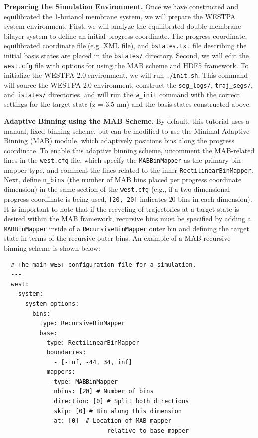 \textbf{Preparing the Simulation Environment.}  Once we have constructed and equilibrated the 1-butanol membrane system, we will prepare the WESTPA system environment. 
First, we will analyze the equilibrated double membrane bilayer system to define an initial progress coordinate. 
The progress coordinate, equilibrated coordinate file (e.g. XML file), and \verb|bstates.txt| file describing the initial basis states are placed in the \verb|bstates/| directory. 
Second, we will edit the \verb|west.cfg| file with options for using the MAB scheme and HDF5 framework. 
To initialize the WESTPA 2.0 environment, we will run \verb|./init.sh|. 
This command will source the WESTPA 2.0 environment, construct the \verb|seg_logs/|, \verb|traj_segs/|, and \verb|istates/| directories, and will run the \verb|w_init| command with the correct settings for the target state (z = 3.5 nm) and the basis states constructed above.

\textbf{Adaptive Binning using the MAB Scheme.} By default, this tutorial uses a manual, fixed binning scheme, but can be modified to use the Minimal Adaptive Binning (MAB) module, which adaptively positions bins along the progress coordinate. 
To enable this adaptive binning scheme, uncomment the MAB-related lines in the \verb|west.cfg| file, which specify the \verb|MABBinMapper| as the primary bin mapper type, and comment the lines related to the inner \verb|RectilinearBinMapper|. 
Next, define \verb|n_bins| (the number of MAB bins placed per progress coordinate dimension) in the same section of the \verb|west.cfg| (e.g., if a two-dimensional progress coordinate is being used, \verb|[20, 20]| indicates 20 bins in each dimension). 
It is important to note that if the recycling of trajectories at a target state is desired within the MAB framework, recursive bins must be specified by adding a \verb|MABBinMapper| inside of a \verb|RecursiveBinMapper| outer bin and defining the target state in terms of the recursive outer bins. 
An example of a MAB recursive binning scheme is shown below:

\begin{verbatim}
  # The main WEST configuration file for a simulation.
  ---
  west:
    system:
      system_options:
        bins:
          type: RecursiveBinMapper
          base:
            type: RectilinearBinMapper
            boundaries:
              - [-inf, -44, 34, inf]
            mappers:
            - type: MABBinMapper
              nbins: [20] # Number of bins
              direction: [0] # Split both directions
              skip: [0] # Bin along this dimension
              at: [0]  # Location of MAB mapper
                             relative to base mapper
\end{verbatim}

